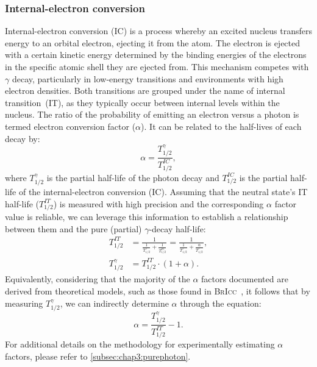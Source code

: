 \subsubsection{Internal-electron conversion}\label{subsubsection:intro:internalconversion}
Internal-electron conversion (\textsc{IC}) is a process whereby an excited nucleus transfers energy to an orbital electron, ejecting it from the atom. The electron is ejected with a certain kinetic energy determined by the binding energies of the electrons in the specific atomic shell they are ejected from. 
This mechanism competes with $\gamma$ decay, particularly in low-energy transitions and environments with high electron densities. Both transitions are grouped under the name of internal transition~(\textsc{IT}), as they typically occur between internal levels within the nucleus. The ratio of the probability of emitting an electron versus a photon is termed electron conversion factor ($\alpha$). It can be related to the half-lives of each decay by:
\begin{equation} 
	\alpha = \frac{T^{\gamma}_{1/2}}{T^{IC}_{1/2}},
	\label{eq:intro:alphafactor} 
  \end{equation}
where $T^{\gamma}_{1/2}$ is the partial half-life of the photon decay and $T^{IC}_{1/2}$ is the partial half-life of the internal-electron conversion (\textsc{IC}).
Assuming that the neutral state's \textsc{IT} half-life ($T^{IT}_{1/2}$) is measured with high precision and the corresponding $\alpha$ factor value is reliable, we can leverage this information to establish a relationship between them and the pure (partial) $\gamma$-decay half-life:
\begin{align} 
	T^{IT}_{1/2} &=\frac{1}{\frac{1}{T^{\gamma}_{1/2}} + \frac{1}{T^{IC}_{1/2}}} = \frac{1}{\frac{1}{T^{\gamma}_{1/2}} + \frac{\alpha}{T^{\gamma}_{1/2}}},
	\label{eq:intro:TIT} \\
	T^{\gamma}_{1/2} &= T^{IT}_{1/2} \cdot (1 + \alpha).
	\label{eq:intro:Tgamma} 
\end{align}
\newpar
Equivalently, considering that the majority of the $\alpha$ factors documented are derived from theoretical models, such as those found in \textsc{BrIcc}~\cite{KIBEDI2008202}, it follows that by measuring $T^{\gamma}_{1/2}$, we can indirectly determine $\alpha$ through the equation:
\begin{equation}
    \alpha = \frac{T^{\gamma}_{1/2}}{T^{IT}_{1/2}} - 1.
    \label{eq:intro:alpha_pureIT}
\end{equation}
For additional details on the methodology for experimentally estimating $\alpha$ factors, please refer to \cref{subsec:chap3:purephoton}.

